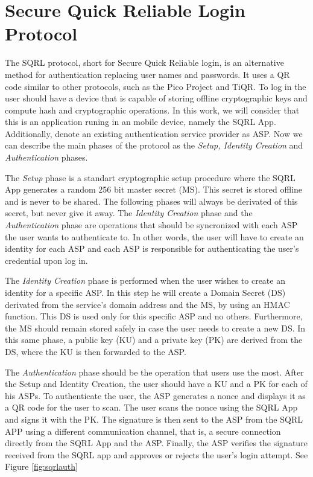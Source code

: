 \documentclass{article}
\begin{document}
\section{Secure Quick Reliable Login Protocol}

	The SQRL protocol, short for Secure Quick Reliable login, is an alternative method 
	for authentication replacing user names and passwords. It uses a QR code
	similar to other protocols, such as the Pico Project and TiQR. To log in
	the user should have a device that is capable of storing offline cryptographic
	keys and compute hash and cryptographic operations. In this work, we will consider that
	this is an application runing in an mobile device, namely the SQRL App. 
	Additionally, denote an existing authentication service provider as ASP. Now
	we can describe the main phases of the protocol as the \emph{Setup, Identity 
	Creation} and \emph{Authentication} phases.

	The \emph{Setup} phase is a standart cryptographic setup procedure where the
	SQRL App generates a random 256 bit master secret (MS). This secret is stored offline and 
	is never to be shared. The following phases will always be derivated of this
	secret, but never give it away. The \emph{Identity Creation} phase and the
	\emph{Authentication} phase are operations that should be syncronized with
	each ASP the user wants to authenticate to. In other words, the user will
	have to create an identity for each ASP and each ASP is responsible 
	for authenticating the user's credential upon log in.

	The \emph{Identity Creation} phase is performed when the user wishes to create an
	identity for a specific ASP. In this step he will create a Domain Secret (DS)
	derivated from the service's domain address and the MS, by using an HMAC function.
	This DS is used only for this specific ASP and no others. Furthermore, the
	MS should remain stored safely in case the user needs to create a new DS. In 
	this same phase, a public key (KU) and a private key (PK) are derived from the
	DS, where the KU is then forwarded to the ASP.


	The \emph{Authentication} phase should be the operation that users use the
	most. After the Setup and Identity Creation, the user should have a KU and
	a PK for each of his ASPs. To authenticate the user, the ASP generates a 
	nonce and displays it as a QR code for the user to scan. The user scans the
	nonce using the SQRL App and signs it with the PK. The signature is then
	sent to the ASP from the SQRL APP using a different communication channel,
	that is, a secure connection directly from the SQRL App and the ASP.
	Finally, the ASP verifies the signature received from the SQRL app and 
	approves or rejects the user's login attempt. See Figure \ref{fig:sqrlauth}
\end{document}
